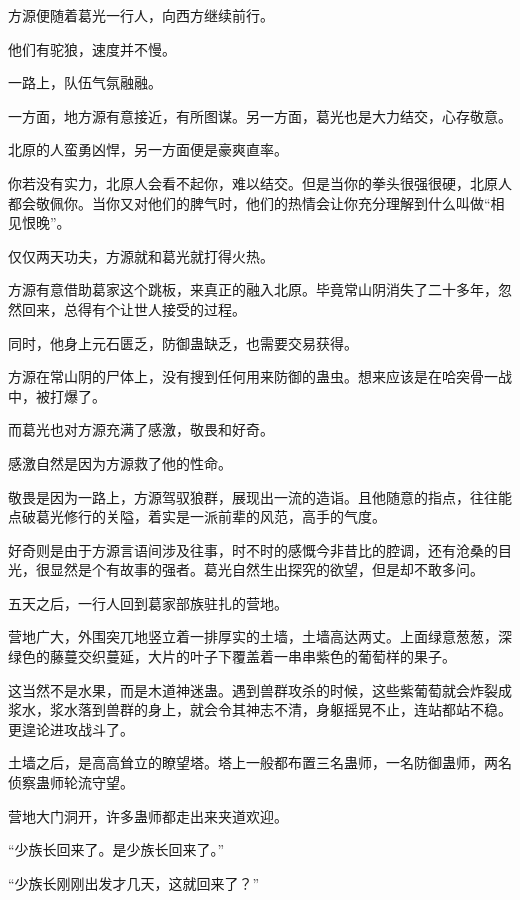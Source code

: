 
\begin{this_body}

方源便随着葛光一行人，向西方继续前行。

他们有驼狼，速度并不慢。

一路上，队伍气氛融融。

一方面，地方源有意接近，有所图谋。另一方面，葛光也是大力结交，心存敬意。

北原的人蛮勇凶悍，另一方面便是豪爽直率。

你若没有实力，北原人会看不起你，难以结交。但是当你的拳头很强很硬，北原人都会敬佩你。当你又对他们的脾气时，他们的热情会让你充分理解到什么叫做“相见恨晚”。

仅仅两天功夫，方源就和葛光就打得火热。

方源有意借助葛家这个跳板，来真正的融入北原。毕竟常山阴消失了二十多年，忽然回来，总得有个让世人接受的过程。

同时，他身上元石匮乏，防御蛊缺乏，也需要交易获得。

方源在常山阴的尸体上，没有搜到任何用来防御的蛊虫。想来应该是在哈突骨一战中，被打爆了。

而葛光也对方源充满了感激，敬畏和好奇。

感激自然是因为方源救了他的性命。

敬畏是因为一路上，方源驾驭狼群，展现出一流的造诣。且他随意的指点，往往能点破葛光修行的关隘，着实是一派前辈的风范，高手的气度。

好奇则是由于方源言语间涉及往事，时不时的感慨今非昔比的腔调，还有沧桑的目光，很显然是个有故事的强者。葛光自然生出探究的欲望，但是却不敢多问。

五天之后，一行人回到葛家部族驻扎的营地。

营地广大，外围突兀地竖立着一排厚实的土墙，土墙高达两丈。上面绿意葱葱，深绿色的藤蔓交织蔓延，大片的叶子下覆盖着一串串紫色的葡萄样的果子。

这当然不是水果，而是木道神迷蛊。遇到兽群攻杀的时候，这些紫葡萄就会炸裂成浆水，浆水落到兽群的身上，就会令其神志不清，身躯摇晃不止，连站都站不稳。更遑论进攻战斗了。

土墙之后，是高高耸立的瞭望塔。塔上一般都布置三名蛊师，一名防御蛊师，两名侦察蛊师轮流守望。

营地大门洞开，许多蛊师都走出来夹道欢迎。

“少族长回来了。是少族长回来了。”

“少族长刚刚出发才几天，这就回来了？”


\end{this_body}

